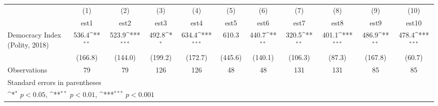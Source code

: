 {
\def\sym#1{\ifmmode^{#1}\else\(^{#1}\)\fi}
\begin{tabular}{l*{10}{c}}
\hline\hline
                    &\multicolumn{1}{c}{(1)}         &\multicolumn{1}{c}{(2)}         &\multicolumn{1}{c}{(3)}         &\multicolumn{1}{c}{(4)}         &\multicolumn{1}{c}{(5)}         &\multicolumn{1}{c}{(6)}         &\multicolumn{1}{c}{(7)}         &\multicolumn{1}{c}{(8)}         &\multicolumn{1}{c}{(9)}         &\multicolumn{1}{c}{(10)}         \\
                    &        est1         &        est2         &        est3         &        est4         &        est5         &        est6         &        est7         &        est8         &        est9         &       est10         \\
\hline
Democracy Index (Polity, 2018)&       536.4\sym{**} &       523.9\sym{***}&       492.8\sym{*}  &       634.4\sym{***}&       610.3         &       440.7\sym{**} &       320.5\sym{**} &       401.1\sym{***}&       486.9\sym{**} &       478.4\sym{***}\\
                    &     (166.8)         &     (144.0)         &     (199.2)         &     (172.7)         &     (445.6)         &     (140.1)         &     (106.3)         &      (87.3)         &     (167.8)         &      (60.7)         \\
\hline
Observations        &          79         &          79         &         126         &         126         &          48         &          48         &         131         &         131         &          85         &          85         \\
\hline\hline
\multicolumn{11}{l}{\footnotesize Standard errors in parentheses}\\
\multicolumn{11}{l}{\footnotesize \sym{*} \(p<0.05\), \sym{**} \(p<0.01\), \sym{***} \(p<0.001\)}\\
\end{tabular}
}
